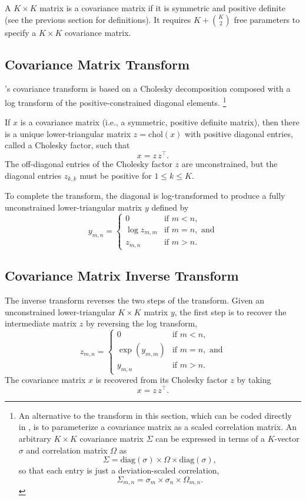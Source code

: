 A $K \times K$ matrix is a covariance matrix if it is symmetric and
positive definite (see the previous section for definitions).  It
requires $K + \binom{K}{2}$ free parameters to specify a $K \times K$
covariance matrix.


\subsection{Covariance Matrix Transform}

\Stan's covariance transform is based on a Cholesky decomposition
composed with a log transform of the positive-constrained diagonal
elements.%
%
\footnote{An alternative to the transform in this section, which can
  be coded directly in \Stan, is to parameterize a covariance matrix
  as a scaled correlation matrix.  An arbitrary $K \times K$
  covariance matrix $\Sigma$ can be expressed in terms of a $K$-vector
  $\sigma$ and correlation matrix $\Omega$ as
  \[
  \Sigma = \mbox{diag}(\sigma) \times \Omega \times \mbox{diag}(\sigma),
  \]
  so that each entry is just a deviation-scaled correlation,
  \[
  \Sigma_{m,n} = \sigma_m \times \sigma_n \times \Omega_{m,n}.
  \]
}

If $x$ is a covariance matrix (i.e., a symmetric, positive definite
matrix), then there is a unique lower-triangular matrix $z =
\mbox{chol}(x)$ with positive diagonal entries, called a Cholesky
factor, such that
\[
x = z \, z^{\top}.
\]
The off-diagonal entries of the Cholesky factor $z$ are unconstrained,
but the diagonal entries $z_{k,k}$ must be positive for $1 \leq k
\leq K$.

To complete the transform, the diagonal is log-transformed to produce
a fully unconstrained lower-triangular matrix $y$ defined by
\[
y_{m,n} =
\left\{
\begin{array}{cl}
0 & \mbox{if } m < n,
\\[4pt]
\log z_{m,m} & \mbox{if } m = n, \mbox{ and}
\\[4pt]
z_{m,n} & \mbox{if } m > n.
\end{array}
\right.
\]

\subsection{Covariance Matrix Inverse Transform}

The inverse transform reverses the two steps of the transform.
Given an unconstrained lower-triangular $K \times K$ matrix $y$, the
first step is to recover the intermediate matrix $z$ by reversing the
log transform,
\[
z_{m,n} =
\left\{
\begin{array}{cl}
0 & \mbox{if } m < n,
\\[4pt]
\exp(y_{m,m}) & \mbox{if } m = n, \mbox{ and}
\\[4pt]
y_{m,n} & \mbox{if } m > n.
\end{array}
\right.
\]
%
The covariance matrix $x$ is recovered from its Cholesky factor $z$ by
taking
%
\[
x = z \, z^{\top}.
\]

